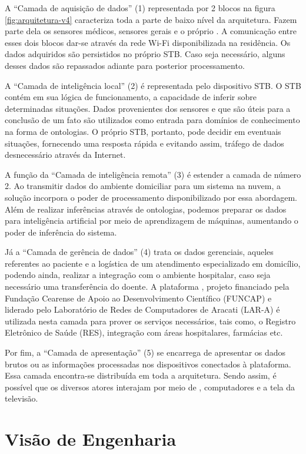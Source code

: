 A ``Camada de aquisição de dados'' (1) representada por 2 blocos na figura 
\ref{fig:arquitetura-v4} caracteriza toda a parte de baixo nível da
arquitetura. Fazem parte dela os sensores médicos, sensores gerais e o próprio
\stb[]. A comunicação entre esses dois blocos dar-se através da rede
Wi-Fi disponibilizada na residência. Os dados adquiridos são persistidos
no próprio STB. Caso seja necessário, alguns desses dados são repassados
adiante para posterior processamento. 

A ``Camada de inteligência local'' (2) é representada pelo dispositivo STB. 
O STB contém em sua lógica de funcionamento, a capacidade de inferir sobre
determinadas situações. Dados provenientes dos sensores e que são úteis para a 
conclusão de um fato são utilizados como entrada para domínios de conhecimento
na forma de ontologias. O próprio STB, portanto, pode decidir em eventuais
situações, fornecendo uma resposta rápida e evitando assim, tráfego de dados 
desnecessário através da Internet.

A função da ``Camada de inteligência remota'' (3) é estender a camada de
número 2. Ao transmitir dados do ambiente domiciliar para um sistema na nuvem,
a solução incorpora o poder de processamento disponibilizado por essa
abordagem. Além de realizar inferências através de ontologias, podemos
preparar os dados para inteligência artificial por meio de aprendizagem de
máquinas, aumentando o poder de inferência do sistema.

Já a ``Camada de gerência de dados'' (4) trata os dados gerenciais, aqueles
referentes ao paciente e a logística de um atendimento especializado em
domicílio, podendo ainda, realizar a integração com o ambiente hospitalar, caso
seja necessário uma transferência do doente. A plataforma \nextsaude[],
projeto financiado pela Fundação Cearense de Apoio ao Desenvolvimento Científico 
(FUNCAP) e liderado pelo Laboratório de Redes de Computadores de Aracati (LAR-A) 
é utilizada nesta camada para prover os serviços necessários, tais como, o 
Registro Eletrônico de Saúde (RES), integração com áreas hospitalares, farmácias etc.

Por fim, a ``Camada de apresentação'' (5) se encarrega de apresentar os dados brutos
ou as informações processadas nos dispositivos conectados à plataforma. Essa
camada encontra-se distribuída em toda a arquitetura. Sendo assim, é possível
que os diversos atores interajam por meio de \smartphones, computadores e
a tela da televisão.

\section{Visão de Engenharia} \label{sec:visao-engenharia}

